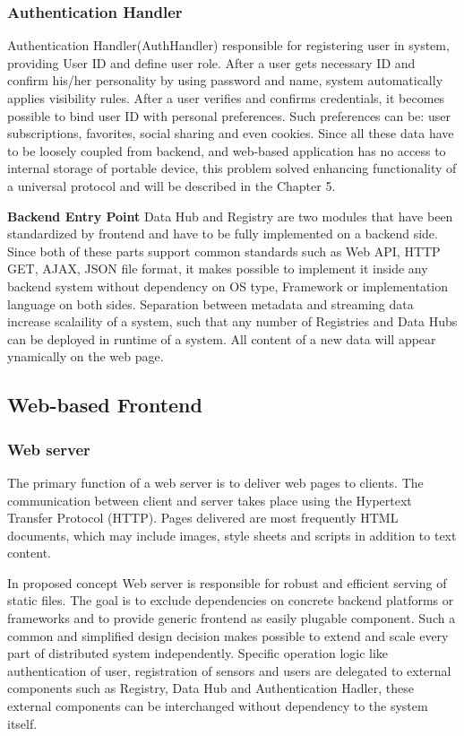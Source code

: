     \subsubsection{Authentication Handler}
    Authentication Handler(AuthHandler) responsible for registering user in system, providing User ID and define user role. After a user gets necessary ID and confirm his/her personality by using password and name, system automatically applies visibility rules. After a user verifies and confirms credentials, it becomes possible to bind user ID with personal preferences. Such preferences can be: user subscriptions, favorites, social sharing and even cookies. Since all these data have to be loosely coupled from backend, and web-based application has no access to internal storage of portable device, this problem solved enhancing functionality of a universal protocol and will be described in the Chapter 5.

    \textbf{Backend Entry Point}
    \newline
    Data Hub and Registry are two modules that have been standardized by frontend and have to be fully implemented on a backend side. Since both of these parts support common standards such as Web API, HTTP GET, AJAX, JSON file format, it makes possible to implement it inside any backend system without dependency on OS type, Framework or implementation language on both sides. Separation between metadata and streaming data increase scalaility of a system, such that any number of Registries and Data Hubs can be deployed in runtime of a system. All content of a new data will appear ynamically on the web page.


  \subsection{Web-based Frontend}
    \subsubsection{Web server}
      The primary function of a web server is to deliver web pages to clients. The communication between client and server takes place using the Hypertext Transfer Protocol (HTTP). Pages delivered are most frequently HTML documents, which may include images, style sheets and scripts in addition to text content. 
  
      In proposed concept Web server is responsible for robust and efficient serving of static files. The goal is to exclude dependencies on concrete backend platforms or frameworks and to provide generic frontend as easily plugable component. Such a common and simplified design decision makes possible to extend and scale every part of distributed system independently. Specific operation logic like authentication of user, registration of sensors and users are delegated to external components such as Registry, Data Hub and Authentication Hadler, these external components can be interchanged without dependency to the system itself.

